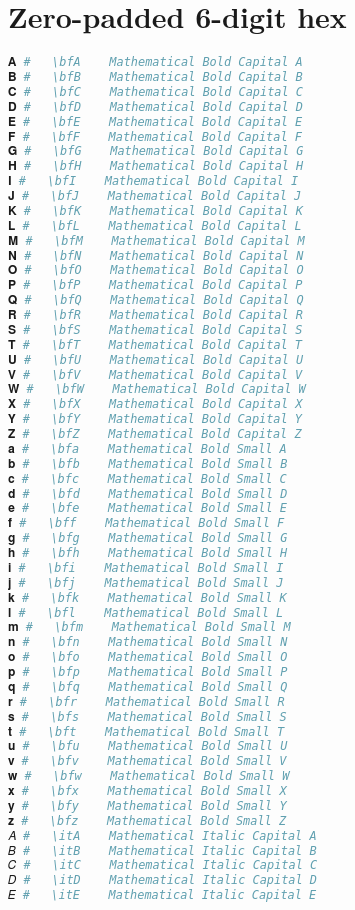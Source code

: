 \section{Zero-padded 6-digit hex}
\begin{lstlisting}[language=Julia]
𝐀 #   \bfA    Mathematical Bold Capital A
𝐁 #   \bfB    Mathematical Bold Capital B
𝐂 #   \bfC    Mathematical Bold Capital C
𝐃 #   \bfD    Mathematical Bold Capital D
𝐄 #   \bfE    Mathematical Bold Capital E
𝐅 #   \bfF    Mathematical Bold Capital F
𝐆 #   \bfG    Mathematical Bold Capital G
𝐇 #   \bfH    Mathematical Bold Capital H
𝐈 #   \bfI    Mathematical Bold Capital I
𝐉 #   \bfJ    Mathematical Bold Capital J
𝐊 #   \bfK    Mathematical Bold Capital K
𝐋 #   \bfL    Mathematical Bold Capital L
𝐌 #   \bfM    Mathematical Bold Capital M
𝐍 #   \bfN    Mathematical Bold Capital N
𝐎 #   \bfO    Mathematical Bold Capital O
𝐏 #   \bfP    Mathematical Bold Capital P
𝐐 #   \bfQ    Mathematical Bold Capital Q
𝐑 #   \bfR    Mathematical Bold Capital R
𝐒 #   \bfS    Mathematical Bold Capital S
𝐓 #   \bfT    Mathematical Bold Capital T
𝐔 #   \bfU    Mathematical Bold Capital U
𝐕 #   \bfV    Mathematical Bold Capital V
𝐖 #   \bfW    Mathematical Bold Capital W
𝐗 #   \bfX    Mathematical Bold Capital X
𝐘 #   \bfY    Mathematical Bold Capital Y
𝐙 #   \bfZ    Mathematical Bold Capital Z
𝐚 #   \bfa    Mathematical Bold Small A
𝐛 #   \bfb    Mathematical Bold Small B
𝐜 #   \bfc    Mathematical Bold Small C
𝐝 #   \bfd    Mathematical Bold Small D
𝐞 #   \bfe    Mathematical Bold Small E
𝐟 #   \bff    Mathematical Bold Small F
𝐠 #   \bfg    Mathematical Bold Small G
𝐡 #   \bfh    Mathematical Bold Small H
𝐢 #   \bfi    Mathematical Bold Small I
𝐣 #   \bfj    Mathematical Bold Small J
𝐤 #   \bfk    Mathematical Bold Small K
𝐥 #   \bfl    Mathematical Bold Small L
𝐦 #   \bfm    Mathematical Bold Small M
𝐧 #   \bfn    Mathematical Bold Small N
𝐨 #   \bfo    Mathematical Bold Small O
𝐩 #   \bfp    Mathematical Bold Small P
𝐪 #   \bfq    Mathematical Bold Small Q
𝐫 #   \bfr    Mathematical Bold Small R
𝐬 #   \bfs    Mathematical Bold Small S
𝐭 #   \bft    Mathematical Bold Small T
𝐮 #   \bfu    Mathematical Bold Small U
𝐯 #   \bfv    Mathematical Bold Small V
𝐰 #   \bfw    Mathematical Bold Small W
𝐱 #   \bfx    Mathematical Bold Small X
𝐲 #   \bfy    Mathematical Bold Small Y
𝐳 #   \bfz    Mathematical Bold Small Z
𝐴 #   \itA    Mathematical Italic Capital A
𝐵 #   \itB    Mathematical Italic Capital B
𝐶 #   \itC    Mathematical Italic Capital C
𝐷 #   \itD    Mathematical Italic Capital D
𝐸 #   \itE    Mathematical Italic Capital E

\end{lstlisting}
